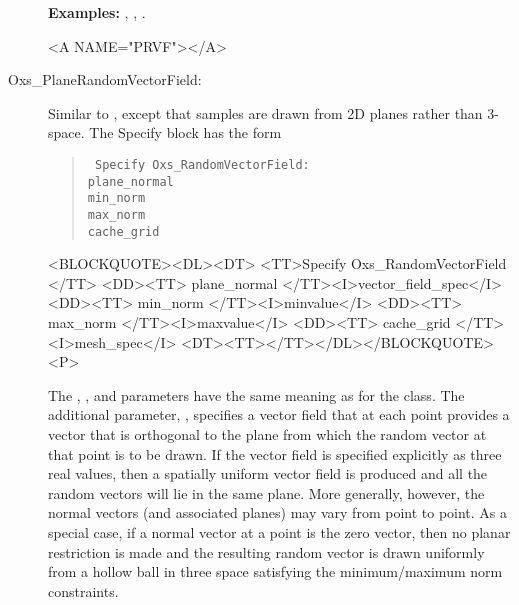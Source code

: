 \begin{description}
\textbf{Examples:} , ,
 .

\begin{rawhtml}<A NAME="PRVF"></A>\end{rawhtml}%
%
\item[Oxs\_PlaneRandomVectorField:]
   Similar to , except that samples are
   drawn from 2D planes rather than 3-space.  The Specify block has the
   form
      \begin{latexonly}
      \begin{quote}\tt
      Specify Oxs\_RandomVectorField: \ocb\\
       \bi plane\_normal \\
       \bi min\_norm \\
       \bi max\_norm \\
       \bi cache\_grid \\
      \ccb
      \end{quote}
      \end{latexonly}
      \begin{rawhtml}<BLOCKQUOTE><DL><DT>
      <TT>Specify Oxs_RandomVectorField {</TT>
      <DD><TT> plane_normal </TT><I>vector_field_spec</I>
      <DD><TT> min_norm </TT><I>minvalue</I>
      <DD><TT> max_norm </TT><I>maxvalue</I>
      <DD><TT> cache_grid </TT><I>mesh_spec</I>
      <DT><TT>}</TT></DL></BLOCKQUOTE><P>
      \end{rawhtml}
  The , , and
   parameters have the same meaning as for the
   class.  The additional parameter,
  , specifies a vector field that at each point
  provides a vector that is orthogonal to the plane from which the
  random vector at that point is to be drawn.  If the vector field is
  specified explicitly as three real values, then a spatially uniform
  vector field is produced and all the random vectors will lie in the
  same plane.  More generally, however, the normal vectors (and
  associated planes) may vary from point to point.  As a special case,
  if a normal vector at a point is the zero vector, then no planar
  restriction is made and the resulting random vector is drawn uniformly
  from a hollow ball in three space satisfying the minimum/maximum norm
  constraints.


\end{description}
